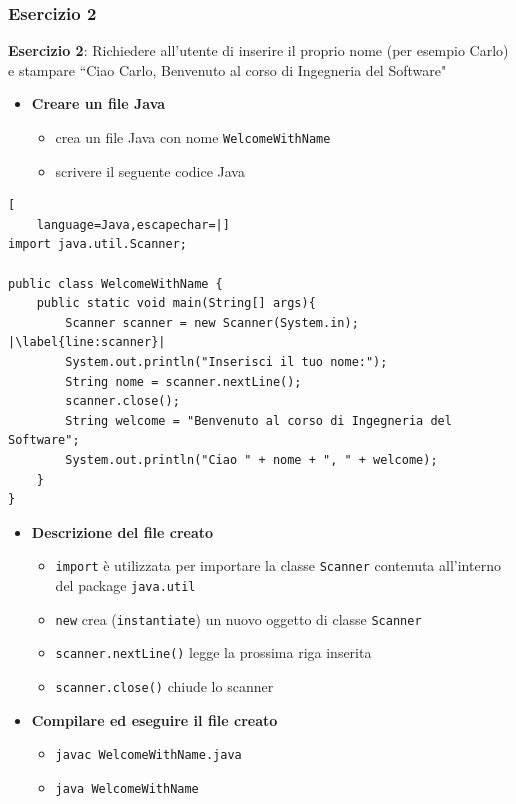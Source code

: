 \documentclass{article}
\theoremstyle{definition}
\begin{document}
\subsubsection{Esercizio 2}
\begin{framed}
\textbf{Esercizio 2}: Richiedere all'utente di inserire il proprio nome (per esempio Carlo) e stampare ``Ciao Carlo, Benvenuto al corso di Ingegneria del Software"
\end{framed}
\begin{itemize}
\item \textbf{Creare un file Java}
\begin{itemize}
\item crea un file Java con nome \texttt{WelcomeWithName}
\item scrivere il seguente codice Java
\end{itemize}
\end{itemize}
\begin{lstlisting}[
    language=Java,escapechar=|]
import java.util.Scanner;

public class WelcomeWithName {
	public static void main(String[] args){
		Scanner scanner = new Scanner(System.in); |\label{line:scanner}|
		System.out.println("Inserisci il tuo nome:");
		String nome = scanner.nextLine();
		scanner.close();
		String welcome = "Benvenuto al corso di Ingegneria del Software";
		System.out.println("Ciao " + nome + ", " + welcome);
	}
}
\end{lstlisting}
\begin{itemize}
\item \textbf{Descrizione del file creato}
\begin{itemize}
\item \texttt{import} \`e utilizzata per importare la classe \texttt{Scanner} contenuta all'interno del package \texttt{java.util}
\item \texttt{new} crea (\texttt{instantiate}) un nuovo oggetto di classe \texttt{Scanner}
\item \texttt{scanner.nextLine()} legge la prossima riga inserita
\item \texttt{scanner.close()} chiude lo scanner
\end{itemize}
\end{itemize}

\begin{itemize}
\item  \textbf{Compilare ed eseguire il file creato}
\begin{itemize}
\item \texttt{javac WelcomeWithName.java}
\item \texttt{java WelcomeWithName}
\end{itemize}
\end{itemize}
\end{document}

